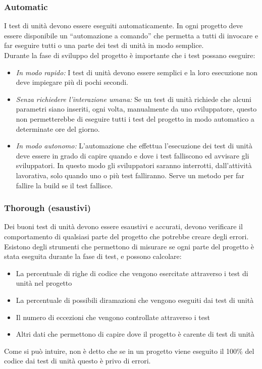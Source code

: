 \documentclass[10pt, a4paper]{article}
\begin{document}
\subsubsection*{Automatic}
I test di unità devono essere eseguiti automaticamente. In ogni progetto deve essere
disponibile un “automazione a comando” che permetta a tutti di invocare e far eseguire tutti
o una parte dei test di unità in modo semplice.\\
Durante la fase di sviluppo del progetto è importante che i test possano eseguire:
\begin{itemize}
\item \textit{In modo rapido:} I test di unità devono essere semplici e la loro esecuzione non deve
impiegare più di pochi secondi.
\item \textit{Senza richiedere l’interazione umana:} Se un test di unità richiede che alcuni parametri
siano inseriti, ogni volta, manualmente da uno sviluppatore, questo non permetterebbe
di eseguire tutti i test del progetto in modo automatico a determinate ore del giorno.
\item \textit{In modo autonomo:} L’automazione che effettua l’esecuzione dei test di unità deve essere in grado di capire quando e dove i test falliscono ed avvisare gli sviluppatori. In
questo modo gli sviluppatori saranno interrotti, dall’attività lavorativa, solo quando uno o più test falliranno. Serve un metodo per far fallire la build se il test fallisce.
\end{itemize}

\subsubsection*{Thorough (esaustivi)}
Dei buoni test di unità devono essere esaustivi e accurati, devono verificare il
comportamento di qualsiasi parte del progetto che potrebbe creare degli errori.\\
Esistono degli strumenti che permettono di misurare se ogni parte del progetto è stata eseguita durante la fase di test, e possono calcolare:
\begin{itemize}
\item La percentuale di righe di codice che vengono esercitate attraverso i test di unità nel progetto
\item La percentuale di possibili diramazioni che vengono eseguiti dai test di unità
\item Il numero di eccezioni che vengono controllate attraverso i test
\item Altri dati che permettono di capire dove il progetto è carente di test di unità
\end{itemize}
Come si può intuire, non è detto che se in un progetto viene eseguito il 100\% del codice dai test di unità questo è privo di errori.
\end{document}
